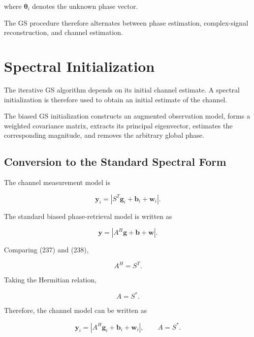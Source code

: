\documentclass[12pt,a4paper]{article}
\begin{document}
where $\boldsymbol{\theta}_i$ denotes the unknown phase vector.

The GS procedure therefore alternates between phase estimation, complex-signal reconstruction, and channel estimation.

\section{Spectral Initialization}

The iterative GS algorithm depends on its initial channel estimate. A spectral initialization is therefore used to obtain an initial estimate of the channel.

The biased GS initialization constructs an augmented observation model, forms a weighted covariance matrix, extracts its principal eigenvector, estimates the corresponding magnitude, and removes the arbitrary global phase.

\subsection{Conversion to the Standard Spectral Form}

The channel measurement model is

\begin{equation}
\mathbf y_i
=
\left|
S^T\mathbf g_i+\mathbf b_i+\mathbf w_i
\right|.
\tag{237}
\end{equation}

The standard biased phase-retrieval model is written as

\begin{equation}
\mathbf y
=
\left|
A^H\mathbf g+\mathbf b+\mathbf w
\right|.
\tag{238}
\end{equation}

Comparing (237) and (238),

\begin{equation}
\boxed{
A^H=S^T
}.
\tag{239}
\end{equation}

Taking the Hermitian relation,

\begin{equation}
A=S^*.
\tag{240}
\end{equation}

Therefore, the channel model can be written as

\begin{equation}
\boxed{
\mathbf y_i
=
\left|
A^H\mathbf g_i+\mathbf b_i+\mathbf w_i
\right|
,
\qquad
A=S^*
}.
\tag{241}
\end{equation}
\end{document}

